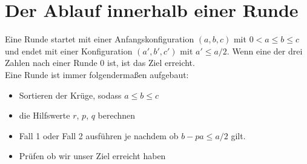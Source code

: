 \section{Der Ablauf innerhalb einer Runde} \label{runden} 
Eine Runde startet mit einer Anfangskonfiguration $(a, b, c)$ mit $0 < a\leq b \le c$ und endet mit einer Konfiguration $(a', b', c')$ mit $a' \leq a/2$. Wenn eine der drei Zahlen nach einer Runde 0 ist, ist das Ziel erreicht. \\
Eine Runde ist immer folgendermaßen aufgebaut:

\begin{itemize}
    \item Sortieren der Krüge, sodass $a \leq b \leq c$
    \item die Hilfswerte $r$, $p$, $q$ berechnen
    \item Fall 1 oder Fall 2 ausführen je nachdem ob $b-pa \leq a/2$ gilt.
    \item Prüfen ob wir unser Ziel erreicht haben
\end{itemize}  
